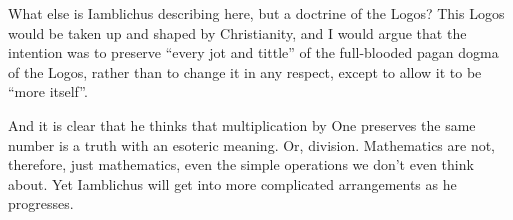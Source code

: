 What else is Iamblichus describing here, but a doctrine of the Logos? This Logos would be taken up and shaped by Christianity, and I would argue that the intention was to preserve ``every jot and tittle'' of the full-blooded pagan dogma of the Logos, rather than to change it in any respect, except to allow it to be ``more itself''.

And it is clear that he thinks that multiplication by One preserves the same number is a truth with an esoteric meaning. Or, division. Mathematics are not, therefore, just mathematics, even the simple operations we don't even think about. Yet Iamblichus will get into more complicated arrangements as he progresses.



